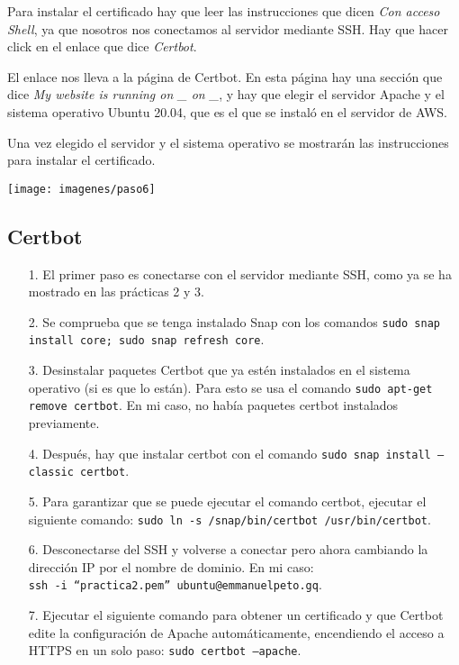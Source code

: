 \documentclass{article}
\begin{document}
Para instalar el certificado hay que leer las instrucciones que dicen \textit{Con acceso Shell}, ya que nosotros nos conectamos al servidor mediante SSH. Hay que hacer click en el enlace que dice \textit{Certbot}.

El enlace nos lleva a la página de Certbot. En esta página hay una sección que dice \textit{My website is running on \_ on \_}, y hay que elegir el servidor Apache y el sistema operativo Ubuntu 20.04, que es el que se instaló en el servidor de AWS.

Una vez elegido el servidor y el sistema operativo se mostrarán las instrucciones para instalar el certificado.

\texttt{[image: imagenes/paso6]}

\subsection{Certbot}

\begin{itemize}

\item[1.] El primer paso es conectarse con el servidor mediante SSH, como ya se ha mostrado en las prácticas 2 y 3.

\item[2.] Se comprueba que se tenga instalado Snap con los comandos \texttt{sudo snap install core; sudo snap refresh core}.

\item[3.] Desinstalar paquetes Certbot que ya estén instalados en el sistema operativo (si es que lo están). Para esto se usa el comando \texttt{sudo apt-get remove certbot}. En mi caso, no había paquetes certbot instalados previamente.

\item[4.] Después, hay que instalar certbot con el comando \texttt{sudo snap install --classic certbot}.

\item[5.] Para garantizar que se puede ejecutar el comando certbot, ejecutar el siguiente comando: \texttt{sudo ln -s /snap/bin/certbot /usr/bin/certbot}.

\item[6.] Desconectarse del SSH y volverse a conectar pero ahora cambiando la dirección IP por el nombre de dominio. En mi caso:\\ \texttt{ssh -i ``practica2.pem'' ubuntu@emmanuelpeto.gq}.

\item[7.] Ejecutar el siguiente comando para obtener un certificado y que Certbot edite la configuración de Apache automáticamente, encendiendo el acceso a HTTPS en un solo paso: \texttt{sudo certbot --apache}.

\end{itemize}
\end{document}
